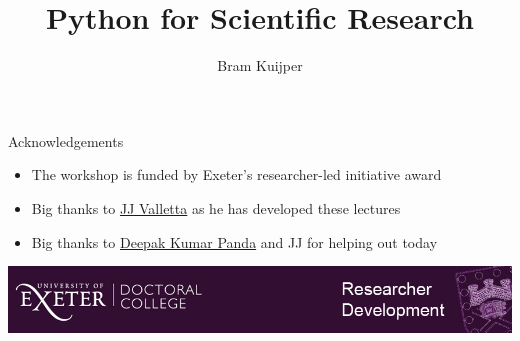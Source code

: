 \documentclass[xcolor=table]{beamer}
\begin{document}
\title{Python for Scientific Research}   
\author{Bram Kuijper}

\frame{\titlepage} 
\begin{frame}{Acknowledgements}
\begin{itemize}\addtolength{\itemsep}{\baselineskip}
	\item The workshop is funded by Exeter's researcher-led initiative award 
	\item Big thanks to \href{https://emps.exeter.ac.uk/mathematics/staff/jjv207}{JJ Valletta} as he has developed these lectures 
    \item Big thanks to \href{http://emps.exeter.ac.uk/mathematics/staff/dp457}{Deepak Kumar Panda} and JJ for helping out today
\end{itemize}
\vfill
\includegraphics[width=\textwidth, keepaspectratio]{logo.jpg}

\end{frame}
\end{document}
